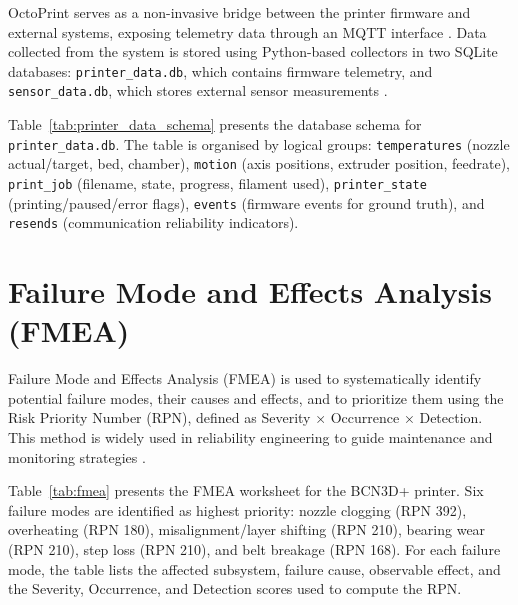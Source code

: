 OctoPrint serves as a non-invasive bridge between the printer firmware and external systems, exposing telemetry data through an MQTT interface \cite{mqtt5_spec}. Data collected from the system is stored using Python-based collectors in two SQLite databases: \texttt{printer\_data.db}, which contains firmware telemetry, and \texttt{sensor\_data.db}, which stores external sensor measurements \cite{sqlite2024}.

Table~\ref{tab:printer_data_schema} presents the database schema for \texttt{printer\_data.db}. The table is organised by logical groups: \texttt{temperatures} (nozzle actual/target, bed, chamber), \texttt{motion} (axis positions, extruder position, feedrate), \texttt{print\_job} (filename, state, progress, filament used), \texttt{printer\_state} (printing/paused/error flags), \texttt{events} (firmware events for ground truth), and \texttt{resends} (communication reliability indicators).

\begin{table}[H]
\centering

\label{tab:printer_data_schema}
\end{table}

\section{Failure Mode and Effects Analysis (FMEA)}

Failure Mode and Effects Analysis (FMEA) is used to systematically identify potential failure modes, their causes and effects, and to prioritize them using the Risk Priority Number (RPN), defined as Severity × Occurrence × Detection. This method is widely used in reliability engineering to guide maintenance and monitoring strategies \cite{liu2013risk, iec60812}.

Table~\ref{tab:fmea} presents the FMEA worksheet for the BCN3D+ printer. Six failure modes are identified as highest priority: nozzle clogging (RPN 392), overheating (RPN 180), misalignment/layer shifting (RPN 210), bearing wear (RPN 210), step loss (RPN 210), and belt breakage (RPN 168). For each failure mode, the table lists the affected subsystem, failure cause, observable effect, and the Severity, Occurrence, and Detection scores used to compute the RPN.

\begin{table}[H]
\centering

\label{tab:fmea}
\end{table}

